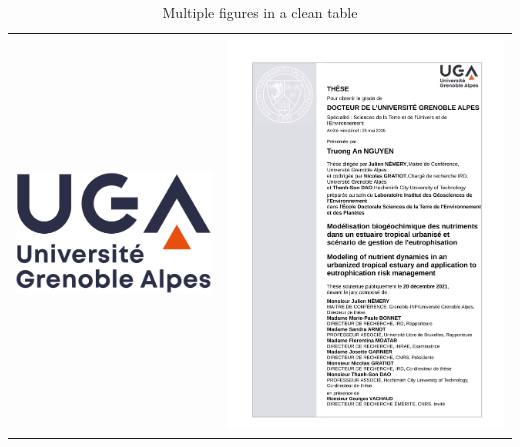 \documentclass[
  letterpaper,
  oneside,
  openany]{MastersDoctoralThesis}
\theoremstyle{plain}
\theoremstyle{remark}
\begin{document}
\begin{longtable}[]{@{}
  >{\centering\arraybackslash}p{}
  >{\centering\arraybackslash}p{}@{}}
\caption{Multiple figures in a clean
table}\label{tbl-multi-clean}\tabularnewline
\toprule\noalign{}
\endfirsthead
\endhead
\bottomrule\noalign{}
\endlastfoot
\includegraphics[width=0.9\linewidth,height=\textheight,keepaspectratio]{Chapters/images/logo.png}
&
\includegraphics[width=0.9\linewidth,height=\textheight,keepaspectratio]{Chapters/images/cover.pdf} \\
\end{longtable}
\end{document}
